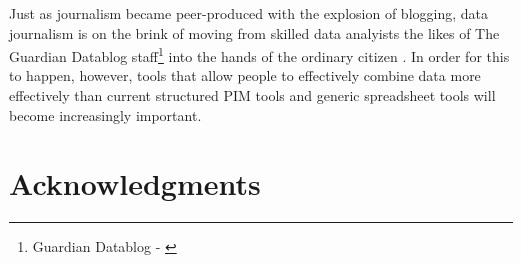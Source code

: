 \documentclass{sigchi}
\begin{document}

Just as journalism became peer-produced with the explosion of blogging, data journalism is on the brink of moving from skilled data analyists the likes of The Guardian Datablog staff\footnote{Guardian Datablog - \url{}} into the hands of the ordinary citizen \cite{datajournalismhandbook}.  In order for this to happen, however, tools that allow people to effectively combine data more effectively than current structured PIM tools and generic spreadsheet tools will become increasingly important. 

\section{Acknowledgments}


%
%
%
%
%
\balance



\end{document}
